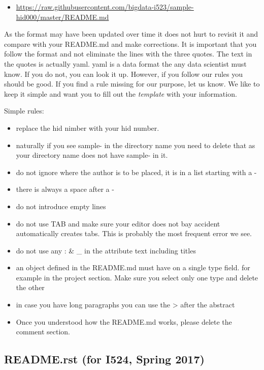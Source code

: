 \begin{itemize}
\tightlist
\item
  \url{https://raw.githubusercontent.com/bigdata-i523/sample-hid000/master/README.md}
\end{itemize}

As the format may have been updated over time it does not hurt to
revisit it and compare with your README.md and make corrections. It is
important that you follow the format and not eliminate the lines with
the three quotes. The text in the quotes is actually yaml. yaml is a
data format the any data scientist must know. If you do not, you can
look it up. However, if you follow our rules you should be good. If you
find a rule missing for our purpose, let us know. We like to keep it
simple and want you to fill out the \emph{template} with your
information.

Simple rules:

\begin{itemize}
\tightlist
\item
  replace the hid nimber with your hid number.
\item
  naturally if you see sample- in the directory name you need to delete
  that as your directory name does not have sample- in it.
\item
  do not ignore where the author is to be placed, it is in a list
  starting with a -
\item
  there is always a space after a -
\item
  do not introduce empty lines
\item
  do not use TAB and make sure your editor does not bay accident
  automatically creates tabs. This is probably the most frequent error
  we see.
\item
  do not use any : \& \_ in the attribute text including titles
\item
  an object defined in the README.md must have on a single type field.
  for example in the project section. Make sure you select only one type
  and delete the other
\item
  in case you have long paragraphs you can use the \textgreater{} after
  the abstract
\item
  Once you understood how the README.md works, please delete the comment
  section.
\end{itemize}

\subsection{README.rst (for I524, Spring
2017)}\label{readme.rst-for-i524-spring-2017}

